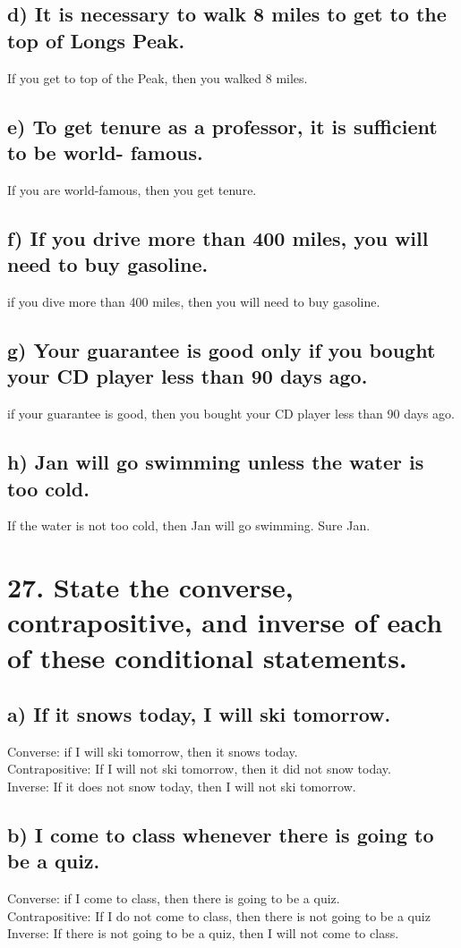 \documentclass[11pt, oneside]{article} %
\numberwithin{equation}{section} %
\numberwithin{figure}{section} %
\numberwithin{table}{section} %
\begin{document}
\subsection{d) It is necessary to walk 8 miles to get to the top of
Longs Peak.}
If you get to top of the Peak, then you walked 8 miles.
\subsection{e) To get tenure as a professor, it is sufficient to be world-
famous.}
If you are world-famous, then you get tenure.
\subsection{f) If you drive more than 400 miles, you will need to buy
gasoline.}
if you dive more than 400 miles, then you will need to buy gasoline.
\subsection{g) Your guarantee is good only if you bought your CD
player less than 90 days ago.}
if your guarantee is good, then you bought your CD player less than 90 days ago.
\subsection{h) Jan will go swimming unless the water is too cold.}
If the water is not too cold, then Jan will go swimming. Sure Jan. 

\section{27. State the converse, contrapositive, and inverse of each of
these conditional statements.}
\subsection{a) If it snows today, I will ski tomorrow.}
Converse: if I will ski tomorrow, then it snows today.\\
Contrapositive: If I will not ski tomorrow, then it did not snow today.\\
Inverse: If it does not snow today, then I will not ski tomorrow.
\subsection{b) I come to class whenever there is going to be a quiz.}
Converse: if I come to class, then there is going to be a quiz.\\
Contrapositive: If I do not come to class, then there is not going to be a quiz\\
Inverse: If there is not going to be a quiz, then I will not come to class.
\end{document}
